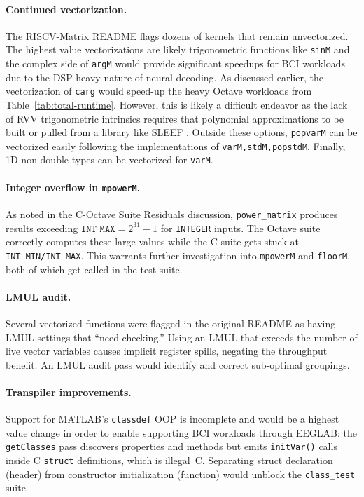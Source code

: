 \paragraph{Continued vectorization.}
The RISCV-Matrix README flags dozens of kernels that remain unvectorized. The highest value vectorizations are likely trigonometric functions like \texttt{sinM} and the complex side of \texttt{argM} would provide significant speedups for BCI workloads due to the DSP-heavy nature of neural decoding. As discussed earlier, the vectorization of \texttt{carg} would speed-up the heavy Octave workloads from Table~\ref{tab:total-runtime}. However, this is likely a difficult endeavor as the lack of RVV trigonometric intrinsics requires that polynomial approximations to be built or pulled from  a library like SLEEF \cite{sleef}. Outside these options, \texttt{popvarM} can be vectorized easily following the implementations of \texttt{varM,stdM,popstdM}. Finally, 1D non-double types can be vectorized for \texttt{varM}.

\paragraph{Integer overflow in \texttt{mpowerM}.}
As noted in the C-Octave Suite Residuals discussion, \texttt{power\_matrix} produces results exceeding $\texttt{INT\_MAX} = 2^{31} - 1$ for \texttt{INTEGER} inputs. The Octave suite correctly computes these large values while the C suite gets stuck at \texttt{INT\_MIN/INT\_MAX}. This warrants further investigation into \texttt{mpowerM} and \texttt{floorM}, both of which get called in the test suite.

\paragraph{LMUL audit.}
Several vectorized functions were flagged in the original README as having LMUL settings that ``need checking.'' Using an LMUL that exceeds the number of live vector variables causes implicit register spills, negating the throughput benefit. An LMUL audit pass would identify and correct sub-optimal groupings.

\paragraph{Transpiler improvements.} 
Support for MATLAB's \texttt{classdef} OOP is incomplete and would be a highest value change in order to enable supporting BCI workloads through EEGLAB: the \texttt{getClasses} pass discovers properties and methods but emits \texttt{initVar()} calls inside C \texttt{struct} definitions, which is illegal~C. Separating struct declaration (header) from constructor initialization (function) would unblock the \texttt{class\_test} suite.

